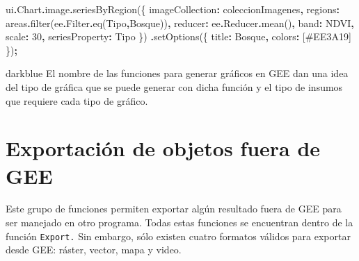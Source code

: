 \documentclass[
  12pt,
  letterpaper,
  twoside]{book}
\newenvironment{Shaded}{\begin{snugshade}}{\end{snugshade}}
\newcommand{\AttributeTok}[1]{\textcolor[rgb]{0.77,0.63,0.00}{#1}}
\newcommand{\DataTypeTok}[1]{\textcolor[rgb]{0.13,0.29,0.53}{#1}}
\newcommand{\DecValTok}[1]{\textcolor[rgb]{0.00,0.00,0.81}{#1}}
\newcommand{\FunctionTok}[1]{\textcolor[rgb]{0.00,0.00,0.00}{#1}}
\newcommand{\NormalTok}[1]{#1}
\newcommand{\OperatorTok}[1]{\textcolor[rgb]{0.81,0.36,0.00}{\textbf{#1}}}
\newcommand{\StringTok}[1]{\textcolor[rgb]{0.31,0.60,0.02}{#1}}
\begin{document}
\begin{Shaded}
\begin{Highlighting}[]
\NormalTok{ui}\OperatorTok{.}\AttributeTok{Chart}\OperatorTok{.}\AttributeTok{image}\OperatorTok{.}\FunctionTok{seriesByRegion}\NormalTok{(\{}
  \DataTypeTok{imageCollection}\OperatorTok{:}\NormalTok{ coleccionImagenes}\OperatorTok{,} 
  \DataTypeTok{regions}\OperatorTok{:}\NormalTok{ areas}\OperatorTok{.}\FunctionTok{filter}\NormalTok{(ee}\OperatorTok{.}\AttributeTok{Filter}\OperatorTok{.}\FunctionTok{eq}\NormalTok{(}\StringTok{\textquotesingle{}Tipo\textquotesingle{}}\OperatorTok{,}\StringTok{\textquotesingle{}Bosque\textquotesingle{}}\NormalTok{))}\OperatorTok{,}
  \DataTypeTok{reducer}\OperatorTok{:}\NormalTok{ ee}\OperatorTok{.}\AttributeTok{Reducer}\OperatorTok{.}\FunctionTok{mean}\NormalTok{()}\OperatorTok{,} 
  \DataTypeTok{band}\OperatorTok{:} \StringTok{\textquotesingle{}NDVI\textquotesingle{}}\OperatorTok{,} 
  \DataTypeTok{scale}\OperatorTok{:} \DecValTok{30}\OperatorTok{,} 
  \DataTypeTok{seriesProperty}\OperatorTok{:} \StringTok{\textquotesingle{}Tipo\textquotesingle{}}
\NormalTok{\})}
  \OperatorTok{.}\FunctionTok{setOptions}\NormalTok{(\{}
    \DataTypeTok{title}\OperatorTok{:} \StringTok{\textquotesingle{}Bosque\textquotesingle{}}\OperatorTok{,}
    \DataTypeTok{colors}\OperatorTok{:}\NormalTok{ [}\StringTok{\textquotesingle{}\#EE3A19\textquotesingle{}}\NormalTok{]}
\NormalTok{  \})}\OperatorTok{;}
\end{Highlighting}
\end{Shaded}

\begin{bluebox2}

\begin{awesomeblock}{5pt}{\faLightbulb}{darkblue}
El nombre de las funciones para generar gráficos en GEE dan una idea del tipo de gráfica que se puede generar con dicha función y el tipo de insumos que requiere cada tipo de gráfico.

\end{awesomeblock}

\end{bluebox2}

\hypertarget{exportaciuxf3n-de-objetos-fuera-de-gee}{%
\section{Exportación de objetos fuera de GEE}\label{exportaciuxf3n-de-objetos-fuera-de-gee}}

Este grupo de funciones permiten exportar algún resultado fuera de GEE para ser manejado en otro programa. Todas estas funciones se encuentran dentro de la función \texttt{Export.} Sin embargo, sólo existen cuatro formatos válidos para exportar desde GEE: ráster, vector, mapa y video.
\end{document}
